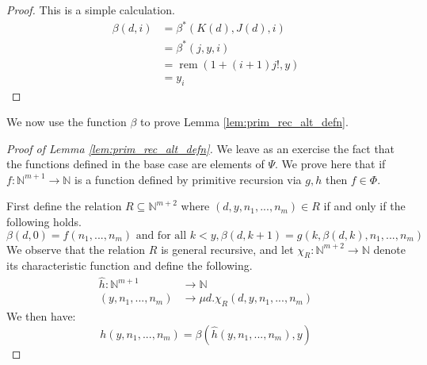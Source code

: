 \documentclass[12pt]{article}
\theoremstyle{plain}
\theoremstyle{definition}
\newcommand{\bb}[1]{\mathbb{#1}}
\newcommand{\lto}{\longrightarrow}
\begin{document}
	\begin{proof}
		This is a simple calculation.
		\begin{align*}
			\beta(d,i) &= \beta^\ast(K(d),J(d),i)\\
			&= \beta^\ast(j,y,i)\\
			&= \operatorname{rem}(1 + (i + 1)j!,y)\\
			&= y_i
		\end{align*}
	\end{proof}
	We now use the function $\beta$ to prove Lemma \ref{lem:prim_rec_alt_defn}.
	\begin{proof}[Proof of Lemma \ref{lem:prim_rec_alt_defn}]
		We leave as an exercise the fact that the functions defined in the base case are elements of $\Psi$. We prove here that if $f: \bb{N}^{m+1} \lto \bb{N}$ is a function defined by primitive recursion via $g,h$ then $f \in \Phi$.
		
		First define the relation $R \subseteq \bb{N}^{m+2}$ where $(d,y,n_1,...,n_m) \in R$ if and only if the following holds.
		\begin{equation}
			\beta(d,0) = f(n_1,...,n_m)\text{ and for all }k < y, \beta(d,k+1) = g(k,\beta(d,k),n_1,...,n_m)
		\end{equation}
		We observe that the relation $R$ is general recursive, and let $\chi_R:\bb{N}^{m+2} \lto \bb{N}$ denote its characteristic function and define the following.
		\begin{align}
			\hat{h}: \bb{N}^{m+1} &\lto \bb{N}\\
			(y,n_1,...,n_m) &\lto \mu d. \chi_R(d,y,n_1,...,n_m)
		\end{align}
		We then have:
		\begin{equation}
			h(y,n_1,...,n_m) = \beta(\hat{h}(y,n_1,...,n_m),y)
		\end{equation}
	\end{proof}
	
	
	
	
\end{document}
